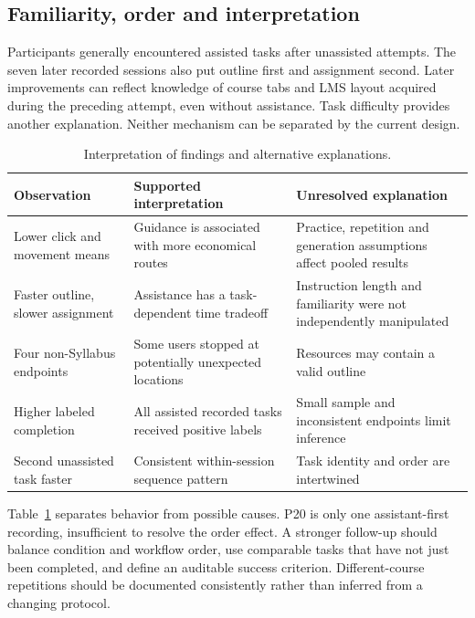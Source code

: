 \documentclass[11pt,a4paper]{article}
\begin{document}
\subsection{Familiarity, order and interpretation}
Participants generally encountered assisted tasks after unassisted attempts. The seven later recorded sessions also put outline first and assignment second. Later improvements can reflect knowledge of course tabs and LMS layout acquired during the preceding attempt, even without assistance. Task difficulty provides another explanation. Neither mechanism can be separated by the current design.

\begin{table}[htbp]\centering\small
\caption{Interpretation of findings and alternative explanations.}\label{tab:interpret}
\begin{tabularx}{\linewidth}{>{\raggedright\arraybackslash}X>{\raggedright\arraybackslash}X>{\raggedright\arraybackslash}X}\toprule
Observation & Supported interpretation & Unresolved explanation\\\midrule
Lower click and movement means & Guidance is associated with more economical routes & Practice, repetition and generation assumptions affect pooled results\\
Faster outline, slower assignment & Assistance has a task-dependent time tradeoff & Instruction length and familiarity were not independently manipulated\\
Four non-Syllabus endpoints & Some users stopped at potentially unexpected locations & Resources may contain a valid outline\\
Higher labeled completion & All assisted recorded tasks received positive labels & Small sample and inconsistent endpoints limit inference\\
Second unassisted task faster & Consistent within-session sequence pattern & Task identity and order are intertwined\\\bottomrule
\end{tabularx}\end{table}

Table~\ref{tab:interpret} separates behavior from possible causes. P20 is only one assistant-first recording, insufficient to resolve the order effect. A stronger follow-up should balance condition and workflow order, use comparable tasks that have not just been completed, and define an auditable success criterion. Different-course repetitions should be documented consistently rather than inferred from a changing protocol.
\end{document}
